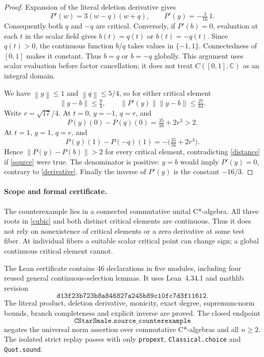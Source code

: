 \documentclass[11pt]{article}
\newcommand{\C}{\mathbb C}
\newcommand{\norm}[1]{\left\lVert#1\right\rVert}
\begin{document}
\begin{proof}
Expansion of the literal deletion derivative gives
\begin{equation}\label{derivative}
 P'(w)=3(w-q)(w+q),\qquad P'(y)=-\tfrac3{16}\,1.
\end{equation}
Consequently both $q$ and $-q$ are critical. Conversely, if $P'(b)=0$, evaluation
at each $t$ in the scalar field gives $b(t)=q(t)$ or $b(t)=-q(t)$.
Since $q(t)>0$, the continuous function $b/q$ takes values in $\{-1,1\}$.
Connectedness of $[0,1]$ makes it constant. Thus $b=q$ or $b=-q$ globally.
This argument uses scalar evaluation before factor cancellation; it does not
treat $C([0,1],\C)$ as an integral domain.

We have $\norm y\leq1$ and $\norm q\leq5/4$, so for either critical element
\begin{equation}\label{distance}
 \norm{y-b}\leq\tfrac94,\qquad
 \norm{P'(y)}\norm{y-b}\leq\tfrac{27}{64}.
\end{equation}
Write $r=\sqrt{17}/4$. At $t=0$, $y=-1$, $q=r$, and
\[
 P(y)(0)-P(q)(0)=\tfrac{35}{16}+2r^3>2.
\]
At $t=1$, $y=1$, $q=r$, and
\[
 P(y)(1)-P(-q)(1)=-\bigl(\tfrac{35}{16}+2r^3\bigr).
\]
Hence $\norm{P(y)-P(b)}>2$ for every critical element, contradicting
\eqref{distance} if \eqref{source} were true.
The denominator is positive: $y=b$ would imply $P'(y)=0$, contrary to
\eqref{derivative}. Finally the inverse of $P'(y)$ is the constant $-16/3$.
\end{proof}

\paragraph{Scope and formal certificate.}
The counterexample lies in a connected commutative unital C*-algebra.
All three roots in \eqref{cubic} and both distinct critical elements are
continuous. Thus it does not rely on nonexistence of critical elements or a
zero derivative at some test fiber. At individual fibers a suitable scalar
critical point can change sign; a global continuous critical element cannot.

The Lean certificate contains 46 declarations in five modules, including four
reused general continuous-selection lemmas. It uses Lean~4.34.1 and mathlib
revision
\[\texttt{d13f23b723b8a846827a245b89c10fc7d3f11612}.\]
The literal product, deletion derivative, monicity, exact degree, supremum-norm
bounds, branch completeness and explicit inverse are proved.
The closed endpoint
\[\texttt{CStarSmale.source\_counterexample}\]
negates the
universal norm assertion over commutative C*-algebras and all $n\geq2$.
The isolated strict replay passes with only \texttt{propext},
\texttt{Classical.choice} and \texttt{Quot.sound}.
\end{document}

